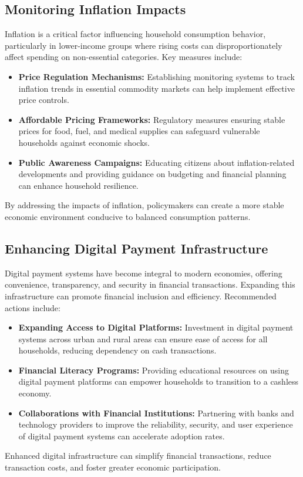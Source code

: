 \documentclass{article}
\begin{document}
\subsection{Monitoring Inflation Impacts}
Inflation is a critical factor influencing household consumption behavior, particularly in lower-income groups where rising costs can disproportionately affect spending on non-essential categories. Key measures include:
\begin{itemize}
	\item \textbf{Price Regulation Mechanisms:} 
	Establishing monitoring systems to track inflation trends in essential commodity markets can help implement effective price controls.
	\item \textbf{Affordable Pricing Frameworks:} 
	Regulatory measures ensuring stable prices for food, fuel, and medical supplies can safeguard vulnerable households against economic shocks.
	\item \textbf{Public Awareness Campaigns:} 
	Educating citizens about inflation-related developments and providing guidance on budgeting and financial planning can enhance household resilience.
\end{itemize}
By addressing the impacts of inflation, policymakers can create a more stable economic environment conducive to balanced consumption patterns.

\subsection{Enhancing Digital Payment Infrastructure}
Digital payment systems have become integral to modern economies, offering convenience, transparency, and security in financial transactions. Expanding this infrastructure can promote financial inclusion and efficiency. Recommended actions include:
\begin{itemize}
	\item \textbf{Expanding Access to Digital Platforms:} 
	Investment in digital payment systems across urban and rural areas can ensure ease of access for all households, reducing dependency on cash transactions.
	\item \textbf{Financial Literacy Programs:} 
	Providing educational resources on using digital payment platforms can empower households to transition to a cashless economy.
	\item \textbf{Collaborations with Financial Institutions:} 
	Partnering with banks and technology providers to improve the reliability, security, and user experience of digital payment systems can accelerate adoption rates.
\end{itemize}
Enhanced digital infrastructure can simplify financial transactions, reduce transaction costs, and foster greater economic participation.
\end{document}
